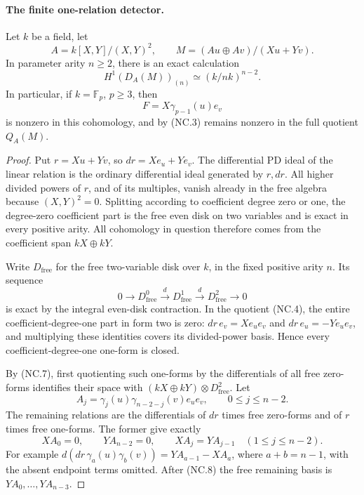 \paragraph{The finite one-relation detector.}
Let \(k\) be a field, let
\[
 A=k[X,Y]/(X,Y)^2,
 \qquad M=(Au\oplus Av)/(Xu+Yv).                       \tag{NC.4}
\]
In parameter arity \(n\geq2\), there is an exact calculation
\[
                    H^1(D_A(M))_{(n)}
                         \simeq (k/nk)^{n-2}.           \tag{NC.5}
\]
In particular, if \(k=\mathbb F_p\), \(p\geq3\), then
\[
                         F=X\gamma_{p-1}(u)e_v          \tag{NC.6}
\]
is nonzero in this cohomology, and by (NC.3) remains nonzero
in the full quotient \(Q_A(M)\).

\begin{proof}
Put \(r=Xu+Yv\), so \(dr=Xe_u+Ye_v\).
The differential PD ideal of the linear relation is the ordinary
differential ideal generated by \(r,dr\).  All higher divided
powers of \(r\), and of its multiples, vanish already in the
free algebra because \((X,Y)^2=0\).  Splitting according to
coefficient degree zero or one, the degree-zero coefficient part
is the free even disk on two variables and is exact in every
positive arity.  All cohomology in question therefore comes
from the coefficient span \(kX\oplus kY\).

Write \(D_\mathrm{free}\) for the free two-variable disk over
\(k\), in the fixed positive arity \(n\).  Its sequence
\[
 0\longrightarrow D_\mathrm{free}^0
 \xrightarrow d D_\mathrm{free}^1
 \xrightarrow d D_\mathrm{free}^2\longrightarrow0
                                                               \tag{NC.7}
\]
is exact by the integral even-disk contraction.  In the quotient
(NC.4), the entire coefficient-degree-one part in form two is
zero: \(dr\,e_v=Xe_ue_v\) and
\(dr\,e_u=-Ye_ue_v\), and multiplying these identities covers
its divided-power basis.  Hence every coefficient-degree-one
one-form is closed.

By (NC.7), first quotienting such one-forms by the differentials
of all free zero-forms identifies their space with
\((kX\oplus kY)\otimes D_\mathrm{free}^2\).
Let
\[
 A_j=\gamma_j(u)\gamma_{n-2-j}(v)e_ue_v,
                         \qquad 0\leq j\leq n-2.
\]
The remaining relations are the differentials of
\(dr\) times free zero-forms and of \(r\) times free one-forms.
The former give exactly
\[
 XA_0=0,\qquad YA_{n-2}=0,\qquad
                 XA_j=YA_{j-1}\quad(1\leq j\leq n-2).
                                                               \tag{NC.8}
\]
For example
\(d(dr\,\gamma_a(u)\gamma_b(v))
=YA_{a-1}-XA_a\), where \(a+b=n-1\), with the absent
endpoint terms omitted.  After (NC.8) the free remaining basis
is \(YA_0,\ldots,YA_{n-3}\).


\end{proof}
